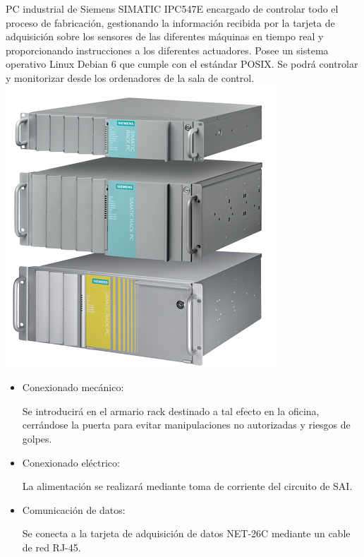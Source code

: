 	PC industrial de Siemens SIMATIC IPC547E encargado de controlar todo el proceso de fabricación, gestionando la información recibida por la tarjeta de adquisición sobre los sensores de las diferentes máquinas en tiempo real y proporcionando instrucciones a los diferentes actuadores. Posee un sistema operativo Linux Debian 6 que cumple con el estándar POSIX. Se podrá controlar y monitorizar desde los ordenadores de la sala de control.\\

	\includegraphics[scale=0.4]{Datasheets/12Foto.png}\\

		\begin{itemize}
				\item{Conexionado mecánico:}
				
				Se introducirá en el armario rack destinado a tal efecto en la oficina, cerrándose la puerta para evitar manipulaciones no autorizadas y riesgos de golpes.

				\item{Conexionado eléctrico:}
				
				La alimentación se realizará mediante toma de corriente del circuito de SAI.

				\item{Comunicación de datos:}
				
				Se conecta a la tarjeta de adquisición de datos NET-26C mediante un cable de red RJ-45.
		\end{itemize}

\newpage

